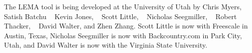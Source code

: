 \documentclass[titlepage,11pt]{article}
\begin{document}
\noindent
The LEMA tool is being developed at the University of Utah
by 
Chris Myers,
~
Satish Batchu
~
Kevin Jones,
~
Scott Little,
~
Nicholas Seegmiller,
~
Robert Thacker,
~
David Walter,
and
Zhen Zhang.
Scott Little is now with Freescale in Austin, Texas, Nicholas Seegmiller is now
with Backcountry.com in Park City, Utah, and David Walter is now with the
Virginia State University.
  
\end{document}
